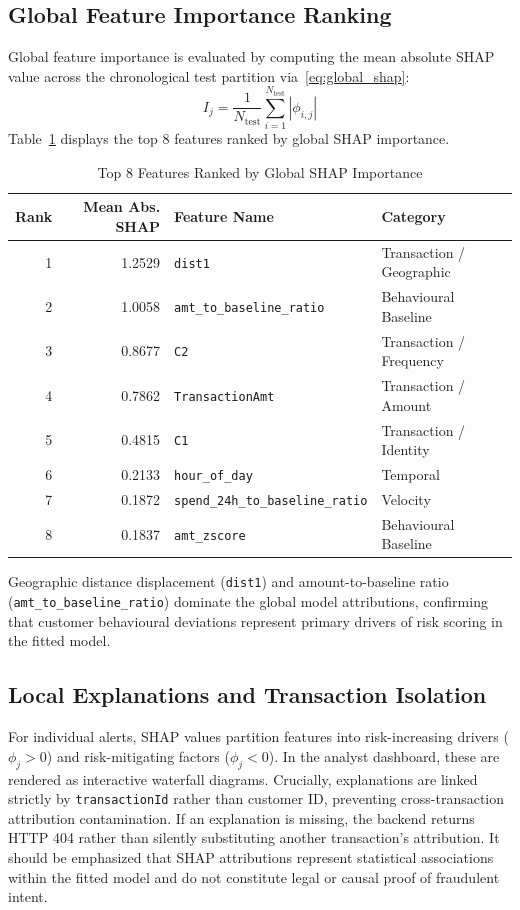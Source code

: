 \documentclass[conference]{IEEEtran}
\begin{document}
\subsection{Global Feature Importance Ranking}
Global feature importance is evaluated by computing the mean absolute SHAP value across the chronological test partition via~\eqref{eq:global_shap}:
\begin{equation}
I_j = \frac{1}{N_{\text{test}}} \sum_{i=1}^{N_{\text{test}}} |\phi_{i,j}|
\label{eq:global_shap}
\end{equation}
Table~\ref{tab:shap_importance} displays the top 8 features ranked by global SHAP importance.

\begin{table}[t]
\centering
\caption{Top 8 Features Ranked by Global SHAP Importance}
\label{tab:shap_importance}
\small
\begin{tabular}{rrll}
\toprule
\textbf{Rank} & \textbf{Mean Abs. SHAP} & \textbf{Feature Name} & \textbf{Category} \\
\midrule
1 & 1.2529 & \texttt{dist1} & Transaction / Geographic \\
2 & 1.0058 & \texttt{amt\_to\_baseline\_ratio} & Behavioural Baseline \\
3 & 0.8677 & \texttt{C2} & Transaction / Frequency \\
4 & 0.7862 & \texttt{TransactionAmt} & Transaction / Amount \\
5 & 0.4815 & \texttt{C1} & Transaction / Identity \\
6 & 0.2133 & \texttt{hour\_of\_day} & Temporal \\
7 & 0.1872 & \texttt{spend\_24h\_to\_baseline\_ratio} & Velocity \\
8 & 0.1837 & \texttt{amt\_zscore} & Behavioural Baseline \\
\bottomrule
\end{tabular}
\end{table}

Geographic distance displacement (\texttt{dist1}) and amount-to-baseline ratio (\texttt{amt\_to\_baseline\_ratio}) dominate the global model attributions, confirming that customer behavioural deviations represent primary drivers of risk scoring in the fitted model.

\subsection{Local Explanations and Transaction Isolation}
For individual alerts, SHAP values partition features into risk-increasing drivers ($\phi_j > 0$) and risk-mitigating factors ($\phi_j < 0$). In the analyst dashboard, these are rendered as interactive waterfall diagrams. Crucially, explanations are linked strictly by \texttt{transactionId} rather than customer ID, preventing cross-transaction attribution contamination. If an explanation is missing, the backend returns HTTP 404 rather than silently substituting another transaction's attribution. It should be emphasized that SHAP attributions represent statistical associations within the fitted model and do not constitute legal or causal proof of fraudulent intent.
\end{document}

